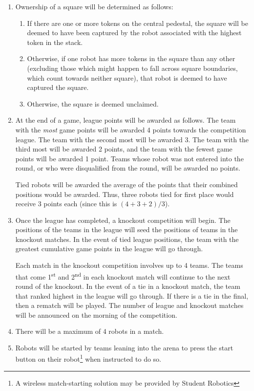 \begin{enumerate}
\item Ownership of a square will be determined as follows:
\begin{enumerate}
  \item If there are one or more tokens on the central pedestal, the square will be deemed to have been captured by the robot associated with the highest token in the stack.
  \item Otherwise, if one robot has more tokens in the square than any other (excluding those which might happen to fall across square boundaries, which count towards neither square), that robot is deemed to have captured the square.
  \item Otherwise, the square is deemed unclaimed.
\end{enumerate}

\item At the end of a game, league points will be awarded as follows.
      The team with the \emph{most} game points will be awarded 4 points towards the competition league.
      The team with the second most will be awarded 3.
      The team with the third most will be awarded 2 points, and the team with the fewest game points will be awarded 1 point.
      Teams whose robot was not entered into the round, or who were disqualified from the round, will be awarded no points.

      Tied robots will be awarded the average of the points that their combined positions would be awarded.
      Thus, three robots tied for first place would receive 3 points each (since this is $(4+3+2)/3$).

\item Once the league has completed, a knockout competition will begin.
      The positions of the teams in the league will seed the positions of teams in the knockout matches.
      In the event of tied league positions, the team with the greatest cumulative game points in the league will go through.

      Each match in the knockout competition involves up to 4 teams.
      The teams that come 1\textsuperscript{st} and 2\textsuperscript{nd} in each knockout match will continue to the next round of the knockout.
      In the event of a tie in a knockout match, the team that ranked highest in the league will go through.
      If there is a tie in the final, then a rematch will be played.
      The number of league and knockout matches will be announced on the morning of the competition.

\item There will be a maximum of 4 robots in a match.
\item Robots will be started by teams leaning into the arena to press the start button on their robot\footnote{A wireless match-starting solution may be provided by Student Robotics} when instructed to do so.


\end{enumerate}
